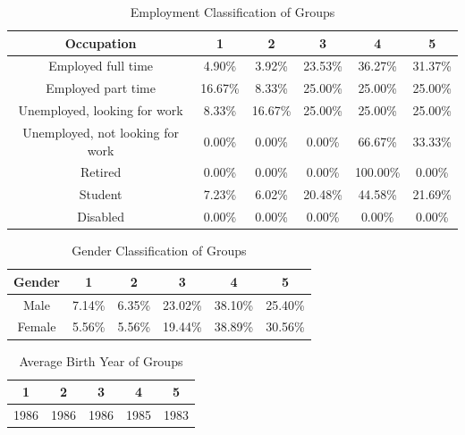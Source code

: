 \begin{table}[h!]
  \centering
  \caption{Employment Classification of Groups}
  \label{tab:emp_c}
  \begin{tabular}{cccccc}
    \toprule
     Occupation&1&2&3&4&5\\
    \midrule
Employed full time	&4.90\%	&3.92\%	&23.53\%	&36.27\%	&31.37\%\\
Employed part time	&16.67\%	&8.33\%	&25.00\%	&25.00\%	&25.00\%\\
Unemployed, looking for work	&8.33\%	&16.67\%	&25.00\%	&25.00\%	&25.00\%\\
Unemployed, not looking for work	&0.00\%	&0.00\%	&0.00\%	&66.67\%	&33.33\%\\
Retired	&0.00\%	&0.00\%	&0.00\%	&100.00\% &	0.00\%\\
Student	&7.23\%	&6.02\%	&20.48\%	&44.58\%	&21.69\%\\
Disabled	&0.00\%	&0.00\%	&0.00\%	&0.00\%	&0.00\%\\
    \bottomrule
  \end{tabular}
\end{table}



\begin{table}[h!]
  \centering
  \caption{Gender Classification of Groups}
  \label{tab:gender_c}
  \begin{tabular}{cccccc}
    \toprule
     Gender&1&2&3&4&5 \\
    \midrule
Male&	7.14\%	&6.35\%	&23.02\%	&38.10\%	&25.40\% \\
Female	&5.56\%	&5.56\%	&19.44\%	&38.89\%	&30.56\% \\
    \bottomrule
  \end{tabular}
\end{table}



\begin{table}[h!]
  \centering
  \caption{Average Birth Year of Groups}
  \label{tab:year_c}
  \begin{tabular}{ccccc}
    \toprule
     1&2&3&4&5\\
    \midrule
	1986& 1986& 1986& 1985& 1983\\
    \bottomrule
  \end{tabular}
\end{table}



